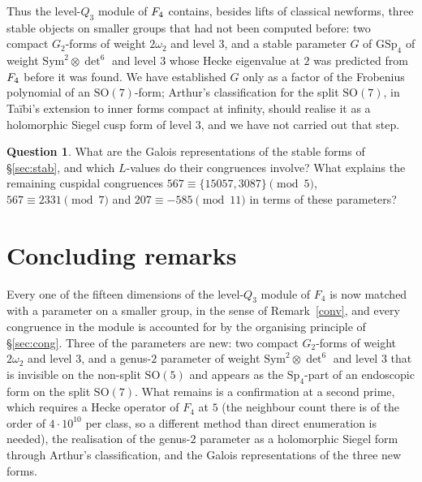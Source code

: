 \documentclass[11pt]{amsart}
\theoremstyle{definition}
\newtheorem{question}[theorem]{Question}
\begin{document}
Thus the level-$Q_3$ module of $F_4$ contains, besides lifts of classical newforms, three stable objects on smaller groups that had not been computed before: two compact $G_2$-forms of weight $2\omega_2$ and level $3$, and a stable parameter $G$ of $\mathrm{GSp}_4$ of weight $\mathrm{Sym}^2\otimes\det^6$ and level $3$ whose Hecke eigenvalue at $2$ was predicted from $F_4$ before it was found. We have established $G$ only as a factor of the Frobenius polynomial of an $\mathrm{SO}(7)$-form; Arthur's classification for the split $\mathrm{SO}(7)$, in Ta\"ibi's extension to inner forms compact at infinity, should realise it as a holomorphic Siegel cusp form of level $3$, and we have not carried out that step.

\begin{question}
What are the Galois representations of the stable forms of \S\ref{sec:stab}, and which $L$-values do their congruences involve? What explains the remaining cuspidal congruences $567\equiv\{15057,3087\}\pmod5$, $567\equiv2331\pmod7$ and $207\equiv-585\pmod{11}$ in terms of these parameters?
\end{question}

\section{Concluding remarks}
Every one of the fifteen dimensions of the level-$Q_3$ module of $F_4$ is now matched with a parameter on a smaller group, in the sense of Remark~\ref{conv}, and every congruence in the module is accounted for by the organising principle of \S\ref{sec:cong}. Three of the parameters are new: two compact $G_2$-forms of weight $2\omega_2$ and level $3$, and a genus-$2$ parameter of weight $\mathrm{Sym}^2\otimes\det^6$ and level $3$ that is invisible on the non-split $\mathrm{SO}(5)$ and appears as the $\mathrm{Sp}_4$-part of an endoscopic form on the split $\mathrm{SO}(7)$. What remains is a confirmation at a second prime, which requires a Hecke operator of $F_4$ at $5$ (the neighbour count there is of the order of $4\cdot10^{10}$ per class, so a different method than direct enumeration is needed), the realisation of the genus-$2$ parameter as a holomorphic Siegel form through Arthur's classification, and the Galois representations of the three new forms.

\appendix
\end{document}
